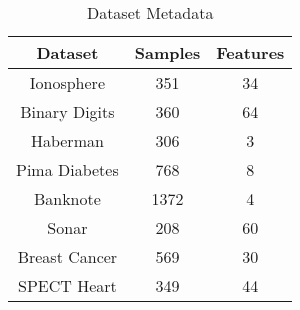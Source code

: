 \begin{table}[htbp]
\caption{Dataset Metadata}
\begin{center}
\begin{tabular}{|c|c|c|}
\hline
\textbf{Dataset} & \textbf{Samples} & \textbf{Features} \\ \hline
Ionosphere & 351 & 34 \\ \hline
Binary Digits & 360 & 64 \\ \hline
Haberman & 306 & 3 \\ \hline
Pima Diabetes & 768 & 8 \\ \hline
Banknote & 1372 & 4 \\ \hline
Sonar & 208 & 60 \\ \hline
Breast Cancer & 569 & 30 \\ \hline
SPECT Heart & 349 & 44 \\ \hline
\end{tabular}
\label{tab:metadata}
\end{center}
\end{table}